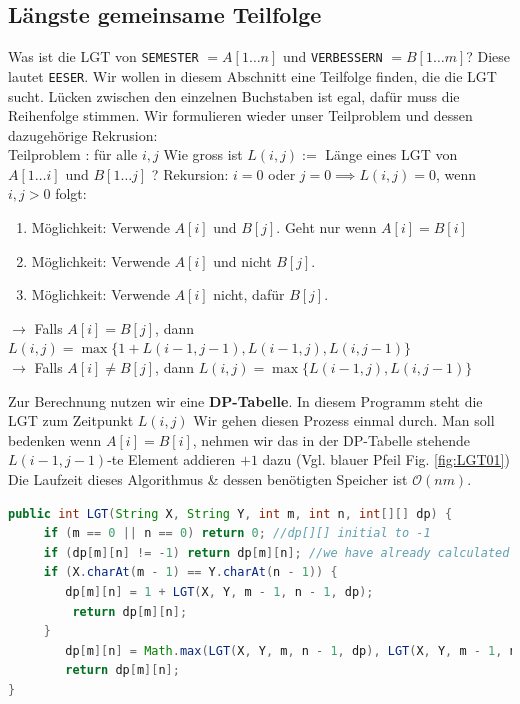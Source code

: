 \documentclass[a4paper]{article}
\begin{document}
\subsection{Längste gemeinsame Teilfolge}
Was ist die LGT von \texttt{SEMESTER} $= A[1\dots n]$ und \texttt{VERBESSERN} $= B[1\dots m]$? Diese lautet \texttt{EESER}.
Wir wollen in diesem Abschnitt eine Teilfolge finden, die die LGT sucht. Lücken zwischen den einzelnen Buchstaben ist egal, dafür muss die Reihenfolge stimmen. Wir formulieren wieder unser Teilproblem und dessen dazugehörige Rekrusion:\\
Teilproblem : für alle $i,j$ Wie gross ist $L(i,j) :=$ Länge eines LGT von $A[1\dots i]$ und $B[1\dots j]$ ?
Rekursion: $i = 0$ oder $j = 0 \implies L(i,j) = 0$, wenn $i,j > 0$   folgt:
\begin{enumerate}
    \item Möglichkeit: Verwende $A[i]$ und $B[j]$. Geht nur wenn $A[i] = B[i]$
    \item Möglichkeit: Verwende $A[i]$ und nicht $B[j]$.
    \item Möglichkeit: Verwende $A[i]$ nicht, dafür $B[j]$.
\end{enumerate}
$\rightarrow$ Falls  $A[i] = B[j]$, dann $L(i,j) = \max\lbrace 1 + L(i-1, j-1), L(i-1, j), L(i, j-1) \rbrace$ \\
$\rightarrow$ Falls  $A[i] \neq B[j]$, dann $L(i,j) = \max\lbrace L(i-1, j), L(i, j-1) \rbrace$

Zur Berechnung nutzen wir eine \textbf{DP-Tabelle}. In diesem Programm steht die LGT zum Zeitpunkt $L(i,j)$
Wir gehen diesen Prozess einmal durch. Man soll bedenken wenn $A[i] = B[i]$, nehmen wir das in der DP-Tabelle stehende $L(i-1,j-1)$-te Element addieren $+1$ dazu (Vgl. blauer Pfeil Fig. \ref{fig:LGT01}) 
Die Laufzeit dieses Algorithmus \& dessen benötigten Speicher ist $\mathcal{O}(nm)$.

\begin{lstlisting}[language = Java , commentstyle=\color{teal}]
public int LGT(String X, String Y, int m, int n, int[][] dp) {
     if (m == 0 || n == 0) return 0; //dp[][] initial to -1
     if (dp[m][n] != -1) return dp[m][n]; //we have already calculated value
     if (X.charAt(m - 1) == Y.charAt(n - 1)) {
        dp[m][n] = 1 + LGT(X, Y, m - 1, n - 1, dp);
         return dp[m][n];
     }
        dp[m][n] = Math.max(LGT(X, Y, m, n - 1, dp), LGT(X, Y, m - 1, n, dp));
        return dp[m][n];
}
\end{lstlisting}
\end{document}
